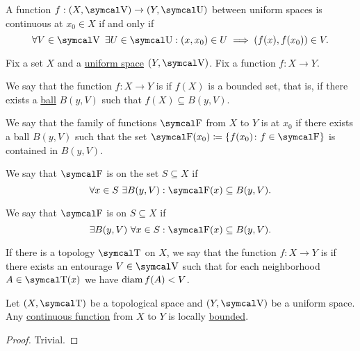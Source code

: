 \begin{corollary}\label{thm:uniform_space_local_continuity}
  A function \( f: (X, \CV) \to (Y, \CU) \) between uniform spaces is continuous at \( x_0 \in X \) if and only if
  \begin{equation*}
    \forall V \in \CV \ \exists U \in \CU : (x, x_0) \in U \implies (f(x), f(x_0)) \in V.
  \end{equation*}
\end{corollary}

\begin{definition}\label{def:bounded_function}
  Fix a set \( X \) and a \hyperref[def:uniform_space]{uniform space} \( (Y, \CV) \). Fix a function \( f: X \to Y \).

  \begin{DefEnum}
     We say that the function \( f: X \to Y \) is  if \( f(X) \) is a bounded set, that is, if there exists a \hyperref[def:entourage/ball]{ball} \( B(y, V) \) such that \( f(X) \subseteq B(y, V) \).

     We say that the family of functions \( \CF \) from \( X \) to \( Y \) is  at \( x_0 \) if there exists a ball \( B(y, V) \) such that the set \( \CF(x_0) \coloneqq \{ f(x_0) \colon f \in \CF \} \) is contained in \( B(y, V) \).

     We say that \( \CF \) is  on the set \( S \subseteq X \) if
    \begin{equation*}
      \forall x \in S \ \exists B(y, V) : \CF(x) \subseteq B(y, V).
    \end{equation*}

     We say that \( \CF \) is  on \( S \subseteq X \) if
    \begin{equation*}
      \exists B(y, V) \ \forall x \in S : \CF(x) \subseteq B(y, V).
    \end{equation*}

     If there is a topology \( \CT \) on \( X \), we say that the function \( f: X \to Y \) is  if there exists an entourage \( V \in \CV \) such that for each neighborhood \( A \in \CT(x) \) we have \( \operatorname{diam}{f(A)} < V \).
  \end{DefEnum}
\end{definition}

\begin{proposition}\label{thm:continuous_implies_locally_bounded}
  Let \( (X, \CT) \) be a topological space and \( (Y, \CV) \) be a uniform space. Any \hyperref[thm:uniform_space_local_convergence/topological_source]{continuous function} from \( X \) to \( Y \) is locally \hyperref[def:bounded_function/locally_bounded]{bounded}.
\end{proposition}
\begin{proof}
  Trivial.
\end{proof}

